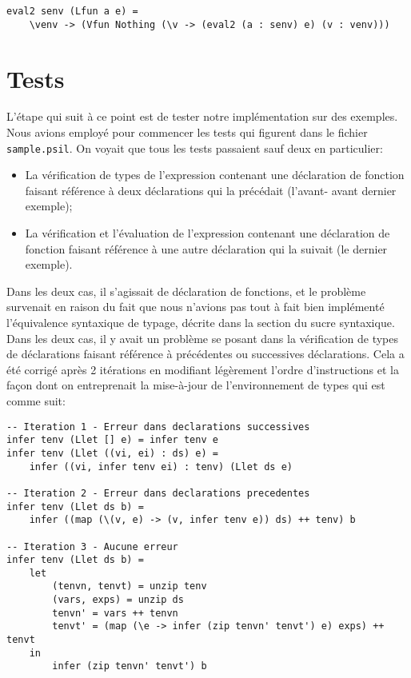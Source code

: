 \documentclass[10pt, titlepage]{article}
\begin{document}
\begin{lstlisting}
eval2 senv (Lfun a e) =
    \venv -> (Vfun Nothing (\v -> (eval2 (a : senv) e) (v : venv)))
\end{lstlisting}

\section{Tests}

L'étape qui suit à ce point est de tester notre implémentation sur des
exemples. Nous avions employé pour commencer les tests qui figurent dans le
fichier \texttt{sample.psil}. On voyait que tous les tests passaient sauf deux
en particulier:
\begin{itemize}
    \item La vérification de types de l'expression contenant une déclaration de
    fonction faisant référence à deux déclarations qui la précédait (l'avant-
    avant dernier exemple);
    \item La vérification et l'évaluation de l'expression contenant une
    déclaration de fonction faisant référence à une autre déclaration qui la
    suivait (le dernier exemple).
\end{itemize}

Dans les deux cas, il s'agissait de déclaration de fonctions, et le problème
survenait en raison du fait que nous n'avions pas tout à fait bien implémenté
l'équivalence syntaxique de typage, décrite dans la section du sucre
syntaxique. \\

Dans les deux cas, il y avait un problème se posant dans la vérification de
types de déclarations faisant référence à précédentes ou successives
déclarations. Cela a été corrigé après 2 itérations en modifiant légèrement
l'ordre d'instructions et la façon dont on entreprenait la mise-à-jour de
l'environnement de types qui est comme suit:

\begin{lstlisting}
-- Iteration 1 - Erreur dans declarations successives
infer tenv (Llet [] e) = infer tenv e
infer tenv (Llet ((vi, ei) : ds) e) =
    infer ((vi, infer tenv ei) : tenv) (Llet ds e)

-- Iteration 2 - Erreur dans declarations precedentes
infer tenv (Llet ds b) =
    infer ((map (\(v, e) -> (v, infer tenv e)) ds) ++ tenv) b

-- Iteration 3 - Aucune erreur
infer tenv (Llet ds b) =
    let
        (tenvn, tenvt) = unzip tenv
        (vars, exps) = unzip ds
        tenvn' = vars ++ tenvn
        tenvt' = (map (\e -> infer (zip tenvn' tenvt') e) exps) ++ tenvt
    in
        infer (zip tenvn' tenvt') b
\end{lstlisting}
\end{document}
